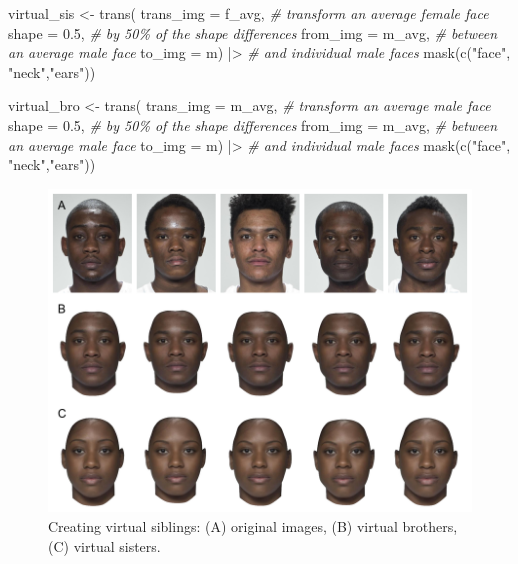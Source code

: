 \documentclass[
  man,floatsintext]{apa6}
\newenvironment{Shaded}{\begin{snugshade}}{\end{snugshade}}
\newcommand{\AttributeTok}[1]{\textcolor[rgb]{0.77,0.63,0.00}{#1}}
\newcommand{\CommentTok}[1]{\textcolor[rgb]{0.56,0.35,0.01}{\textit{#1}}}
\newcommand{\FloatTok}[1]{\textcolor[rgb]{0.00,0.00,0.81}{#1}}
\newcommand{\FunctionTok}[1]{\textcolor[rgb]{0.00,0.00,0.00}{#1}}
\newcommand{\NormalTok}[1]{#1}
\newcommand{\OtherTok}[1]{\textcolor[rgb]{0.56,0.35,0.01}{#1}}
\newcommand{\SpecialCharTok}[1]{\textcolor[rgb]{0.00,0.00,0.00}{#1}}
\newcommand{\StringTok}[1]{\textcolor[rgb]{0.31,0.60,0.02}{#1}}
\begin{document}
\begin{Shaded}
\begin{Highlighting}[]
\NormalTok{virtual\_sis }\OtherTok{\textless{}{-}} \FunctionTok{trans}\NormalTok{(}
  \AttributeTok{trans\_img =}\NormalTok{ f\_avg,   }\CommentTok{\# transform an average female face}
  \AttributeTok{shape =} \FloatTok{0.5}\NormalTok{,         }\CommentTok{\# by 50\% of the shape differences}
  \AttributeTok{from\_img =}\NormalTok{ m\_avg,    }\CommentTok{\# between an average male face}
  \AttributeTok{to\_img =}\NormalTok{ m) }\SpecialCharTok{|\textgreater{}}       \CommentTok{\# and individual male faces}
  \FunctionTok{mask}\NormalTok{(}\FunctionTok{c}\NormalTok{(}\StringTok{"face"}\NormalTok{, }\StringTok{"neck"}\NormalTok{,}\StringTok{"ears"}\NormalTok{)) }

\NormalTok{virtual\_bro }\OtherTok{\textless{}{-}} \FunctionTok{trans}\NormalTok{(}
  \AttributeTok{trans\_img =}\NormalTok{ m\_avg,   }\CommentTok{\# transform an average male face}
  \AttributeTok{shape =} \FloatTok{0.5}\NormalTok{,         }\CommentTok{\# by 50\% of the shape differences}
  \AttributeTok{from\_img =}\NormalTok{ m\_avg,    }\CommentTok{\# between an average male face}
  \AttributeTok{to\_img =}\NormalTok{ m) }\SpecialCharTok{|\textgreater{}}       \CommentTok{\# and individual male faces}
  \FunctionTok{mask}\NormalTok{(}\FunctionTok{c}\NormalTok{(}\StringTok{"face"}\NormalTok{, }\StringTok{"neck"}\NormalTok{,}\StringTok{"ears"}\NormalTok{))}
\end{Highlighting}
\end{Shaded}

\begin{figure}
\includegraphics[width=1\linewidth]{index_files/figure-latex/virtual-sibs-1} \caption{Creating virtual siblings: (A) original images, (B) virtual brothers, (C) virtual sisters.}\label{fig:virtual-sibs}
\end{figure}
\end{document}
